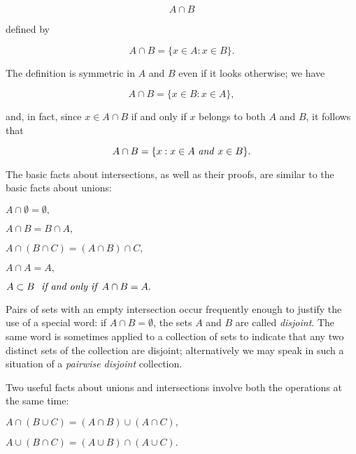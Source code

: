 \begin{equation*}
A \cap B
\end{equation*}

defined by 

\begin{equation*}
A \cap B = \{ x \in A: x \in B \}.
\end{equation*}

The definition is symmetric in $A$ and $B$ even if it looks otherwise; we have 

\begin{equation*}
A \cap B = \{ x \in B: x \in A \},
\end{equation*}

and, in fact, since $x \in A \cap B$ if and only if $x$ belongs to both $A$ and $B$, it follows that 

\begin{equation*}
A \cap B = \{x: x \in A \text{ \textit{and} } x \in B \}.
\end{equation*}

The basic facts about intersections, as well as their proofs, are similar to the basic facts about unions:

\begin{center}
$A \cap \emptyset = \emptyset ,$

$ A \cap B =  B \cap A,$

$A \cap (B \cap C) = (A \cap B) \cap C,$

$A \cap A = A,$

$A \subset B \text{ \textit{ if and only if} } A \cap B = A.$
\end{center}

Pairs of sets with an empty intersection occur frequently enough to justify the use of a special word: if $A \cap B =  \emptyset $, the sets $A$ and $B$ are called \textit{disjoint}. The same word is sometimes applied to a collection of sets to indicate that any two distinct sets of the collection are disjoint; alternatively we may speak in such a situation of a \textit{pairwise disjoint} collection.
 
Two useful facts about unions and intersections involve both the operations at the same time: 

\begin{center}
$A \cap (B \cup C) = (A \cap B) \cup (A \cap C),$

$A \cup (B \cap C) = (A \cup B) \cap (A \cup C).$
\end{center}

